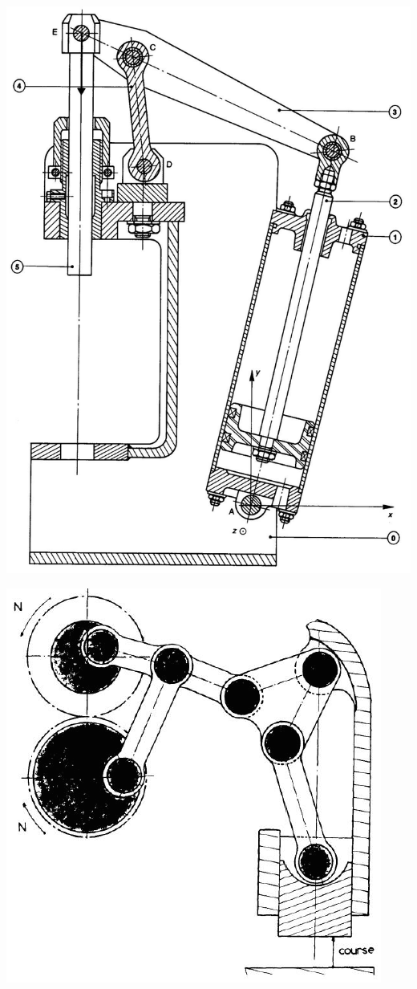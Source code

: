 \vspace{3cm}
\begin{center}
\includegraphics[width=.65\textwidth]{png/fig2-pressedecolleter}
\end{center}


\newpage


\begin{center}
    \includegraphics[scale=0.5]{png/1_exo9.png}
\end{center}


